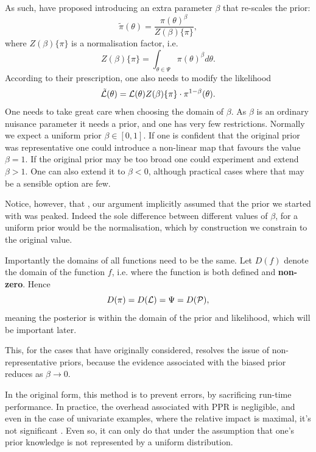 \documentclass[usenatbib]{mnras}
\begin{document}
As such, \citeauthor{chen-ferroz-hobson} have proposed introducing an
extra parameter \(\beta\) that re-scales the prior:
\begin{equation}
  \tilde{\pi}(\theta) = \frac{\pi(\theta)^{\beta}}{Z(\beta)\{\pi\}},
\end{equation}
where \(Z(\beta)\{\pi\}\) is a normalisation factor, i.e. 
\begin{equation}
  Z(\beta)\{\pi\} = \int_{\theta \in \Psi} \pi(\theta)^{\beta}d\theta.
\end{equation}
According to their prescription, one also needs to modify the likelihood
\begin{equation}
  \tilde{\cal L}(\theta) = {\cal L}(\theta) Z(\beta)\{\pi\} \cdot \pi^{1-\beta}(\theta).
\end{equation}
One needs to take great care when choosing the domain of
\(\beta\). As \(\beta\) is an ordinary nuisance parameter it needs a
prior, and one has very few restrictions. Normally we expect a
uniform prior \(\beta \in [0, 1]\). If one is confident that the
original prior was representative one could introduce a non-linear
map that favours the value \(\beta=1\). If the original prior may be
too broad one could experiment and extend \(\beta>1\). One can also
extend it to \(\beta<0\), although practical cases where that may be
a sensible option are few.

Notice, however, that \citeauthor{chen-ferroz-hobson}, our argument
implicitly assumed that the prior we started with was
peaked. Indeed the sole difference between different values of
\(\beta\), for a uniform prior would be the normalisation, which by
construction we constrain to the original value.


Importantly the domains of all functions need to be the same. Let
\(D(f)\) denote the domain of the function \(f\), i.e. where the
function is both defined and \textbf{non-zero}. Hence
\begin{equation}
  D(\pi) = D({\cal L}) = \Psi = D({\cal P}),
\end{equation} 
meaning the posterior is within the domain of the prior and
likelihood, which will be important later.\label{domain-discussion}

This, for the cases that \citeauthor{chen-ferroz-hobson} have
originally considered, resolves the issue of non-representative
priors, because the evidence associated with the biased prior
reduces as \(\beta\rightarrow0\).

In the original form, this method is to prevent errors, by
sacrificing run-time performance. In practice, the overhead
associated with PPR is negligible, and even in the case of
univariate examples, where the relative impact is maximal, it's not
significant \cite[see numerical
examples]{chen-ferroz-hobson}. Even so, it can only do that under the assumption that
one's prior knowledge is not represented by a uniform distribution. 
\end{document}
